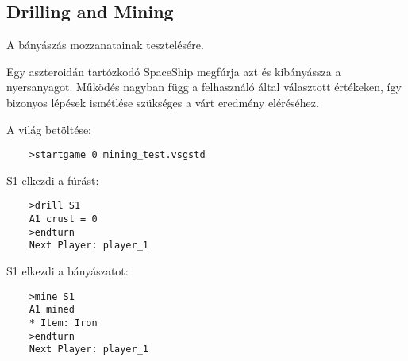 \documentclass[../../projlab]{subfiles}
\begin{document}
\subsection{Drilling and Mining}
\begin{test-case-description}
    A bányászás mozzanatainak tesztelésére.
\end{test-case-description}
\begin{test-case-function}
    Egy aszteroidán tartózkodó SpaceShip megfúrja azt és kibányássza a nyersanyagot. \newline
    Működés nagyban függ a felhasználó által választott értékeken, így bizonyos lépések ismétlése szükséges a várt eredmény eléréséhez.
\end{test-case-function}
\begin{test-case-input}

    A világ betöltése: 
    \begin{verbatim}
    >startgame 0 mining_test.vsgstd
    \end{verbatim}
    S1 elkezdi a fúrást: 
    \begin{verbatim}
    >drill S1
    A1 crust = 0
    >endturn
    Next Player: player_1
    \end{verbatim}
    S1 elkezdi a bányászatot: 
    \begin{verbatim}
    >mine S1
    A1 mined
    * Item: Iron
    >endturn
    Next Player: player_1
    \end{verbatim}
\end{test-case-input}
\begin{test-case-output}

\end{test-case-output}
\end{document}
